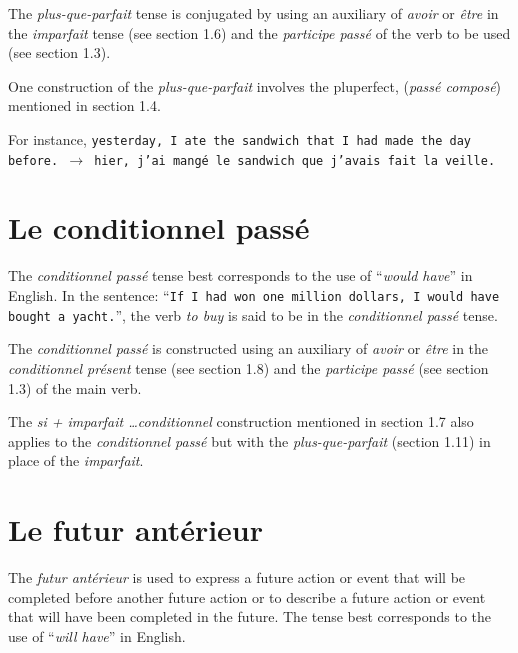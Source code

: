 \documentclass[11pt, oneside]{book}
\begin{document}
{{The \textit{plus-que-parfait} tense is conjugated by using an auxiliary of \textit{avoir} or \textit{\^etre} in the \textit{imparfait} tense (see section 1.6) and the \textit{participe pass\'e} of the verb to be used   (see section 1.3). \vspace{0.5\baselineskip} 

One construction of the \textit{plus-que-parfait} involves the pluperfect, (\textit{pass\'e compos\'e}) mentioned in section 1.4.  \vspace{0.5\baselineskip} 

For instance, \texttt{yesterday, I ate the sandwich that I had made the day before. $\rightarrow$ hier, j'ai mang\'e le sandwich que j'avais fait la veille.}  \vspace{0.5\baselineskip} 

\section{Le conditionnel pass\'e}

The \textit{conditionnel pass\'e} tense best corresponds to the use of “\textit{would have}” in English. In the sentence: ``\texttt{If I had won one million dollars, I would have bought a yacht.}”, the verb \textit{to buy} is said to be in the \textit{conditionnel pass\'e} tense. \vspace{0.5\baselineskip} 

The \textit{conditionnel pass\'e} is constructed using an auxiliary of \textit{avoir} or \textit{\^etre} in the \textit{conditionnel pr\'esent} tense (see section 1.8) and the \textit{participe pass\'e} (see section 1.3) of the main verb. \vspace{0.5\baselineskip} 

The \textit{si + imparfait \ldots conditionnel} construction mentioned in section 1.7 also applies to the \textit{conditionnel pass\'e} but with the \textit{plus-que-parfait} (section 1.11) in place of the \textit{imparfait}. \vspace{0.5\baselineskip} 

\section{Le futur ant\'erieur}

The \textit{futur ant\'erieur} is used to express a future action or event that will be completed before another future action or to describe a future action or event that will have been completed in the future. The tense best corresponds to the use of ``\textit{will have}” in English.\vspace{0.5\baselineskip} 

}}
\end{document}

